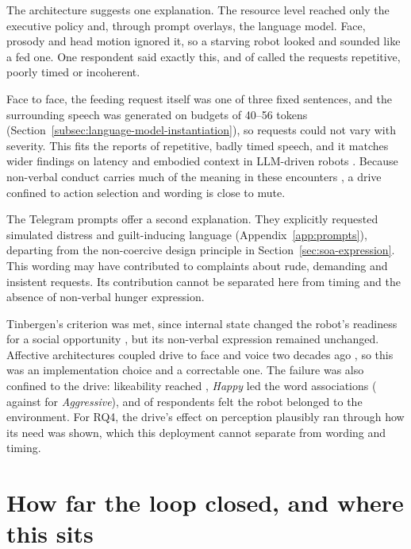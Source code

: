 The architecture suggests one explanation. The resource level reached only the executive policy and, through prompt overlays, the language model. Face, prosody and head motion ignored it, so a starving robot looked and sounded like a fed one. One respondent said exactly this, and \CoreHungerCriticisms{} of \CoreCohortN{} called the requests repetitive, poorly timed or incoherent.

Face to face, the feeding request itself was one of three fixed sentences, and the surrounding speech was generated on budgets of 40--56 tokens (Section~\ref{subsec:language-model-instantiation}), so requests could not vary with severity. This fits the reports of repetitive, badly timed speech, and it matches wider findings on latency and embodied context in LLM-driven robots \citep{PintoBernal2025Designing,Wang2026LLMHRISystematic}. Because non-verbal conduct carries much of the meaning in these encounters \citep{Saunderson2019Nonverbal}, a drive confined to action selection and wording is close to mute.

The Telegram prompts offer a second explanation. They explicitly requested simulated distress and guilt-inducing language (Appendix~\ref{app:prompts}), departing from the non-coercive design principle in Section~\ref{sec:soa-expression}. This wording may have contributed to complaints about rude, demanding and insistent requests. Its contribution cannot be separated here from timing and the absence of non-verbal hunger expression.

Tinbergen's criterion was met, since internal state changed the robot's readiness for a social opportunity \citep{Tinbergen1951Instinct}, but its non-verbal expression remained unchanged. Affective architectures coupled drive to face and voice two decades ago \citep{Breazeal2003Emotion}, so this was an implementation choice and a correctable one. The failure was also confined to the drive: likeability reached \CoreSDLikeabilityMean{}, \emph{Happy} led the word associations (\CoreRosasHappyMean{} against \CoreRosasAggressiveMean{} for \emph{Aggressive}), and \CoreCustomPartOfEnvironmentAgreement{} of \CoreCohortN{} respondents felt the robot belonged to the environment. For RQ4, the drive's effect on perception plausibly ran through how its need was shown, which this deployment cannot separate from wording and timing.

\section{How far the loop closed, and where this sits}
\label{sec:disc-loop-closure}

